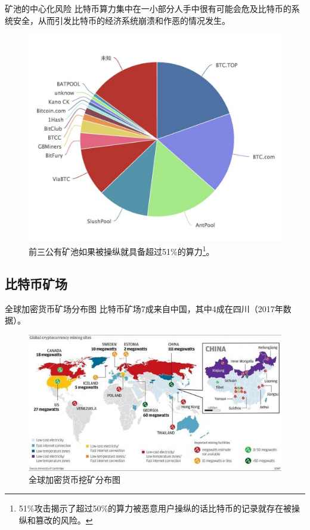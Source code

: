 \documentclass[11pt]{beamer}
\begin{document}
\begin{frame}{矿池的中心化风险}
	比特币算力集中在一小部分人手中很有可能会危及比特币的系统安全，从而引发比特币的经济系统崩溃和作恶的情况发生。

	\begin{figure}
		\centering
		\includegraphics[width=0.45\linewidth]{figures/poolPie}
		\caption{前三公有矿池如果被操纵就具备超过51\%的算力\footnote{51\%攻击揭示了超过50\%的算力被恶意用户操纵的话比特币的记录就存在被操纵和篡改的风险。}。}
		\label{fig:poolpie}
	\end{figure}

\end{frame}

\subsection{比特币矿场}

\begin{frame}{全球加密货币矿场分布图}
	比特币矿场7成来自中国，其中4成在四川（2017年数据）。
	\begin{figure}
		\centering
		\includegraphics[width=0.9\linewidth]{figures/globalCryptocurrencyMiningMap}
		\caption{全球加密货币挖矿分布图}
		\label{fig:globalcryptocurrencyminingmap}
	\end{figure}
\end{frame}
\end{document}
